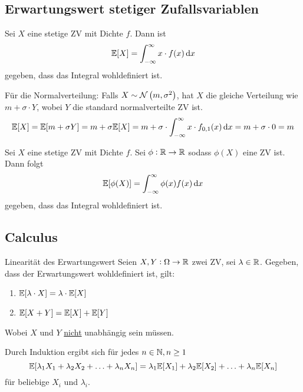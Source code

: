 \subsection{Erwartungswert stetiger Zufallsvariablen}%
\label{sub:erwartungswert_stetiger_zufallsvariablen}

\begin{prop}
	Sei $X$ eine stetige ZV mit Dichte $f$. Dann ist
	\begin{equation*}
		\E [X] = \int_{- \infty}^{\infty} x \cdot f(x) \dif x
	\end{equation*}
	gegeben, dass das Integral wohldefiniert ist.
\end{prop}
Für die Normalverteilung: Falls $X \sim \mathcal{N} \left(m, \sigma^2\right)$, hat $X$ die gleiche Verteilung wie $m + \sigma
\cdot Y$, wobei $Y$ die standard normalverteilte ZV ist.
\begin{equation*}
	\E [X] = \E[m + \sigma Y] = m + \sigma \E [X] = m + \sigma \cdot \int_{- \infty}^{\infty} x \cdot f_{0,1} (x) \dif x
	= m + \sigma \cdot 0 = m
\end{equation*}

\begin{prop}
	Sei $X$ eine stetige ZV mit Dichte $f$. Sei $\phi : \mathbb{R} \rightarrow \mathbb{R}$ sodass $\phi (X)$ eine ZV ist. Dann folgt
	\begin{equation*}
		\E [\phi (X)] = \int_{- \infty}^{\infty} \phi (x) f(x) \dif x
	\end{equation*}
	gegeben, dass das Integral wohldefiniert ist.
\end{prop}



\subsection{Calculus}%
\label{sub:calculus}

\begin{theorem}{Linearität des Erwartungswert}
	Seien $X, Y : \Omega \rightarrow \mathbb{R}$ zwei ZV, sei $ \lambda \in \mathbb{R}$. Gegeben, dass der Erwartungswert wohldefiniert
	ist, gilt:
	\begin{enumerate}
		\item $\mathbb{E} [\lambda \cdot X] = \lambda \cdot \mathbb{E} [X]$
		\item $\mathbb{E} [X + Y] = \mathbb{E} [X] + \mathbb{E} [Y]$
	\end{enumerate}
	Wobei $X$ und $Y$ \underline{nicht} unabhängig sein müssen.
\end{theorem}
Durch Induktion ergibt sich für jedes $n \in \mathbb{N}, n \geq 1$
\begin{equation*}
	\mathbb{E} [\lambda_1 X_1 + \lambda_2 X_2 + \ldots + \lambda_n X_n] = \lambda_1 \mathbb{E} [X_1] + \lambda_2 \mathbb{E}[X_2] + \ldots +
	\lambda_n \mathbb{E} [X_n]
\end{equation*}
für beliebige $X_i$ und $\lambda_i$.

